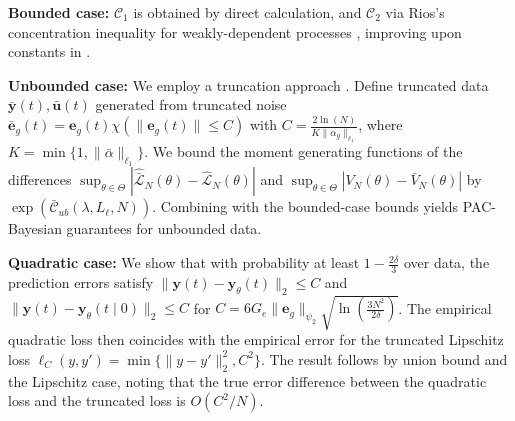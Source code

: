 \documentclass{article}
\def\rvu{{\mathbf{i}}}
\def\rvu{{\mathbf{u}}}
\def\rvy{{\mathbf{y}}}
\newcommand{\e}{\mathbf{e}}
\newcommand{\y}{\mathbf{y}}
\begin{document}
    \textbf{Bounded case:} $\mathcal{C}_1$ is obtained by direct calculation, and $\mathcal{C}_2$ via Rios's concentration inequality for weakly-dependent processes \cite[Prop.\ 4.2]{alquier2013prediction}, improving upon constants in \cite{eringis2023pacbayesRNN,eringis2023pacbayesian}.
    
    \textbf{Unbounded case:} We employ a truncation approach \cite{alquier2012pred}. Define truncated data $\bar{\rvy}(t), \bar{\rvu}(t)$ generated from truncated noise $\bar{\e}_g(t)=\e_g(t)\chi(\|\e_g(t)\| \le C)$ with $C=\frac{2\ln(N)}{K\|\alpha_g\|_{\ell_1}}$, where $K=\min\{1,\|\bar{\alpha}\|_{\ell_1}\}$. We bound the moment generating functions of the differences $\sup_{\theta \in \Theta} |\hat{\bar{\mathcal{L}}}_N(\theta) - \hat{\mathcal{L}}_N(\theta)|$ and $\sup_{\theta \in \Theta} |V_N(\theta) - \bar{V}_N(\theta)|$ by $\exp(\bar{\mathcal{C}}_{ub}(\lambda,L_{\ell},N))$. Combining with the bounded-case bounds yields PAC-Bayesian guarantees for unbounded data.
    
    \textbf{Quadratic case:} We show that with probability at least $1-\frac{2\delta}{3}$ over data, the prediction errors satisfy $\|\y(t)-\y_{\theta}(t)\|_2 \le C$ and $\|\y(t)-\y_{\theta}(t\mid 0)\|_2 \le C$ for $C=6G_e\|\e_g\|_{\psi_2}\sqrt{\ln(\frac{3N^2}{2\delta})}$. The empirical quadratic loss then coincides with the empirical error for the truncated Lipschitz loss $\ell_C(y,y')=\min\{\|y-y'\|_2^2, C^2\}$. The result follows by union bound and the Lipschitz case, noting that the true error difference between the quadratic loss and the truncated loss is $O(C^2/N)$.
\end{document}
